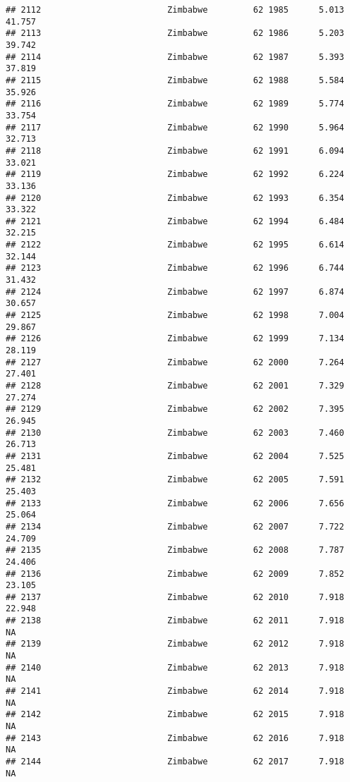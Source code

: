 \documentclass[
]{article}
\begin{document}
\begin{verbatim}
## 2112                         Zimbabwe         62 1985      5.013     41.757
## 2113                         Zimbabwe         62 1986      5.203     39.742
## 2114                         Zimbabwe         62 1987      5.393     37.819
## 2115                         Zimbabwe         62 1988      5.584     35.926
## 2116                         Zimbabwe         62 1989      5.774     33.754
## 2117                         Zimbabwe         62 1990      5.964     32.713
## 2118                         Zimbabwe         62 1991      6.094     33.021
## 2119                         Zimbabwe         62 1992      6.224     33.136
## 2120                         Zimbabwe         62 1993      6.354     33.322
## 2121                         Zimbabwe         62 1994      6.484     32.215
## 2122                         Zimbabwe         62 1995      6.614     32.144
## 2123                         Zimbabwe         62 1996      6.744     31.432
## 2124                         Zimbabwe         62 1997      6.874     30.657
## 2125                         Zimbabwe         62 1998      7.004     29.867
## 2126                         Zimbabwe         62 1999      7.134     28.119
## 2127                         Zimbabwe         62 2000      7.264     27.401
## 2128                         Zimbabwe         62 2001      7.329     27.274
## 2129                         Zimbabwe         62 2002      7.395     26.945
## 2130                         Zimbabwe         62 2003      7.460     26.713
## 2131                         Zimbabwe         62 2004      7.525     25.481
## 2132                         Zimbabwe         62 2005      7.591     25.403
## 2133                         Zimbabwe         62 2006      7.656     25.064
## 2134                         Zimbabwe         62 2007      7.722     24.709
## 2135                         Zimbabwe         62 2008      7.787     24.406
## 2136                         Zimbabwe         62 2009      7.852     23.105
## 2137                         Zimbabwe         62 2010      7.918     22.948
## 2138                         Zimbabwe         62 2011      7.918         NA
## 2139                         Zimbabwe         62 2012      7.918         NA
## 2140                         Zimbabwe         62 2013      7.918         NA
## 2141                         Zimbabwe         62 2014      7.918         NA
## 2142                         Zimbabwe         62 2015      7.918         NA
## 2143                         Zimbabwe         62 2016      7.918         NA
## 2144                         Zimbabwe         62 2017      7.918         NA

\end{verbatim}
\end{document}
